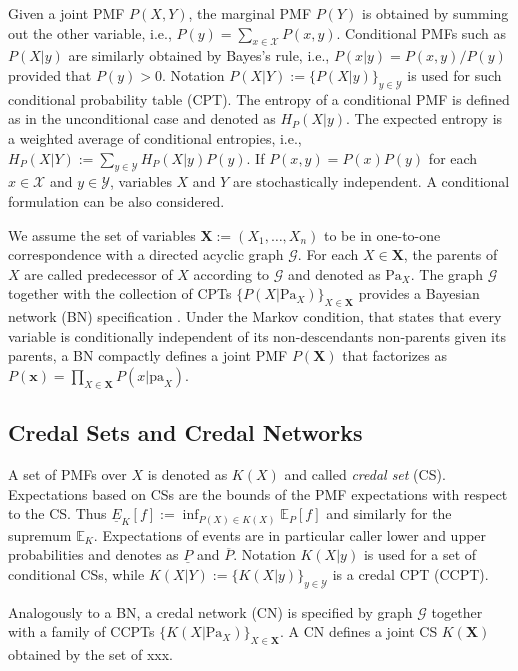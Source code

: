 \documentclass[runningheads]{llncs}
\begin{document}
Given a joint PMF $P(X,Y)$, the marginal PMF $P(Y)$ is obtained by summing out the other variable, i.e., $P(y)=\sum_{x\in\mathcal{X}} P(x,y)$. Conditional PMFs such as $P(X|y)$ are similarly obtained by Bayes's rule, i.e., $P(x|y)=P(x,y)/P(y)$ provided that $P(y)>0$. Notation $P(X|Y):=\{P(X|y)\}_{y\in\mathcal{Y}}$ is used for such conditional probability table (CPT). The entropy of a conditional PMF is defined as in the unconditional case and denoted as $H_P(X|y)$. The expected entropy is a weighted average of conditional entropies, i.e., $H_P(X|Y):=\sum_{y\in\mathcal{Y}} H_P(X|y) P(y)$. If $P(x,y)=P(x) P(y)$ for each $x\in\mathcal{X}$ and $y\in\mathcal{Y}$, variables $X$ and $Y$ are stochastically independent. A conditional formulation can be also considered.

We assume the set of variables $\bm{X}:=(X_1,\ldots,X_n)$ to be in one-to-one correspondence with a directed acyclic graph $\mathcal{G}$. For each $X\in\bm{X}$, the parents of $X$ are called predecessor of $X$ according to $\mathcal{G}$ and denoted as $\mathrm{Pa}_X$. The graph $\mathcal{G}$ together with the collection of CPTs $\{P(X|\mathrm{Pa}_X)\}_{X\in\bm{X}}$ provides a Bayesian network (BN) specification \cite{koller2009}. Under the Markov condition, that states that every variable is conditionally independent of its non-descendants non-parents given its parents, a BN compactly defines a joint PMF $P(\bm{X})$ that factorizes as $P(\bm{x})=\prod_{X\in\bm{X}} P(x|\mathrm{pa}_X)$.

\subsection{Credal Sets and Credal Networks}
A set of PMFs over $X$ is denoted as $K(X)$ and called \emph{credal set} (CS). Expectations based on CSs are the bounds of the PMF expectations with respect to the CS. Thus $\underline{E}_K[f]:=\inf_{P(X)\in K(X)} \mathbb{E}_P[f]$ and similarly for the supremum $\mathbb{E}_K$. Expectations of events are in particular caller lower and upper probabilities and denotes as $\underline{P}$ and $\overline{P}$. Notation $K(X|y)$ is used for a set of conditional CSs, while $K(X|Y):=\{K(X|y)\}_{y\in\mathcal{Y}}$ is a credal CPT (CCPT).

Analogously to a BN, a credal network (CN) \cite{cozman2000}  is specified by graph $\mathcal{G}$ together with a family of CCPTs $\{K(X|\mathrm{Pa}_X)\}_{X\in\bm{X}}$. A CN defines a joint CS $K(\bm{X})$ obtained by the set of xxx.
\end{document}
